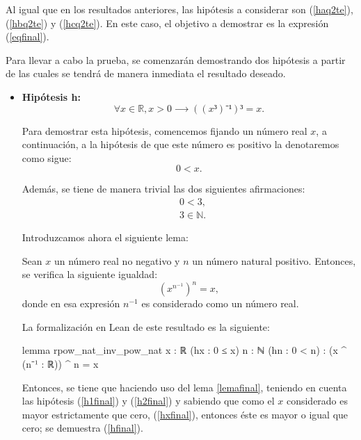 \begin{demostracion}
  Al igual que en los resultados anteriores, las hipótesis a considerar
  son (\ref{haq2te}), (\ref{hbq2te}) y (\ref{hcq2te}). En este caso, el
  objetivo a demostrar es la expresión (\ref{eqfinal}).

  Para llevar a cabo la prueba, se comenzarán demostrando dos hipótesis
  a partir de las cuales se tendrá de manera inmediata el resultado
  deseado.
  \begin{itemize}
  \item \textbf{Hipótesis h:}
    \begin{equation}\label{hfinal}\tag{h}
      ∀x ∈ ℝ, x > 0 ⟶((x³)⁻¹)³ = x.
    \end{equation}

    Para demostrar esta hipótesis, comencemos fijando un número real
    \(x\), a continuación, a la hipótesis de que este número es positivo
    la denotaremos como sigue:
    \begin{equation}\label{hxfinal}\tag{hx}
      0 < x.
    \end{equation}

    Además, se tiene de manera trivial las dos siguientes afirmaciones:
    \begin{align}
      &0 < 3,\label{h1final}\tag{h1}\\
      &3 ∈ ℕ. \label{h2final}\tag{h2}
    \end{align}

    Introduzcamos ahora el siguiente lema:
    \begin{lema}\label{lemafinal}
      Sean \(x\) un número real no negativo y \(n\) un número natural
      positivo. Entonces, se verifica la siguiente igualdad:
      \begin{equation}
        (x^{n^{-1}})^n = x,
      \end{equation}
      donde en esa expresión \(n^{-1} \) es considerado como un número
      real.
    \end{lema}

    La formalización en Lean de este resultado es la siguiente:
    \begin{leancode}
      lemma rpow_nat_inv_pow_nat {x : ℝ} (hx : 0 ≤ x) {n : ℕ} (hn : 0 < n) :
      (x ^ (n⁻¹ : ℝ)) ^ n = x
    \end{leancode}

    Entonces, se tiene que haciendo uso del lema \ref{lemafinal}, teniendo
    en cuenta las hipótesis (\ref{h1final}) y (\ref{h2final}) y sabiendo
    que como el \(x\) considerado es mayor estrictamente que cero,
    (\ref{hxfinal}), entonces éste es mayor o igual que cero; se demuestra
    (\ref{hfinal}).


\end{itemize}
\end{demostracion}
